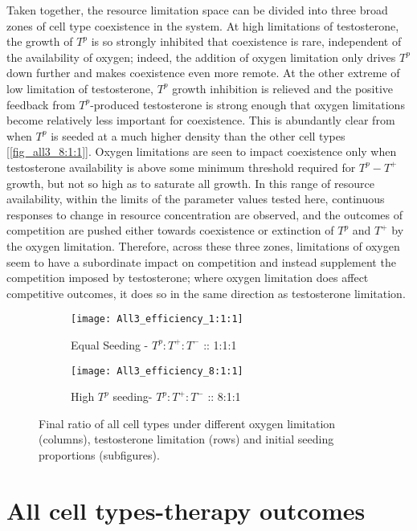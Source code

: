 Taken together, the resource limitation space can be divided into three broad zones of cell type coexistence in the system. At high limitations of testosterone, the growth of $T^p$ is so strongly inhibited that coexistence is rare, independent of the availability of oxygen; indeed, the addition of oxygen limitation only drives $T^p$ down further and makes coexistence even more remote. At the other extreme of low limitation of testosterone, $T^p$ growth inhibition is relieved and the positive feedback from $T^p$-produced testosterone is strong enough that oxygen limitations become relatively less important for coexistence. This is abundantly clear from when $T^p$ is seeded at a much higher density than the other cell types [\autoref{fig_all3_8:1:1}]. Oxygen limitations are seen to impact coexistence only when testosterone availability is above some minimum threshold required for $T^p - T^+$ growth, but not so high as to saturate all growth. In this range of resource availability, within the limits of the parameter values tested here, continuous responses to change in resource concentration are observed, and the outcomes of competition are pushed either towards coexistence or extinction of $T^p$ and $T^+$ by the oxygen limitation. Therefore, across these three zones, limitations of oxygen seem to have a subordinate impact on competition and instead supplement the competition imposed by testosterone; where oxygen limitation does affect competitive outcomes, it does so in the same direction as testosterone limitation.

\begin{figure}[h!]
  \centering
  \begin{subfigure}[b]{\textwidth}
    \centering
    \texttt{[image: All3\_efficiency\_1:1:1]}
    \caption{Equal Seeding - $T^p:T^+:T^-$ :: 1:1:1 }
    \label{fig_all3_1:1:1}
  \end{subfigure}
  \begin{subfigure}[b]{\textwidth}
    \centering
    \texttt{[image: All3\_efficiency\_8:1:1]}
    \caption{High $T^p$ seeding- $T^p:T^+:T^-$ :: 8:1:1}
    \label{fig_all3_8:1:1}
  \end{subfigure}
  \caption[Final ratio of all cell types under different limitations]{Final ratio of all cell types under different oxygen limitation (columns), testosterone limitation (rows) and initial seeding proportions (subfigures).}
  \label{fig_all3}
\end{figure}

\chapter{All cell types-therapy outcomes}
